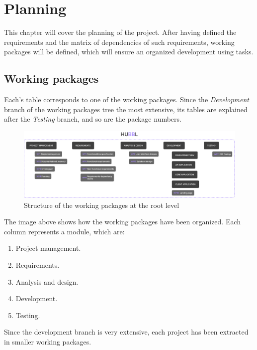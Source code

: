 \documentclass[a4paper, 12pt, oneside]{book}
\begin{document}
\chapter{Planning}
This chapter will cover the planning of the project. After having defined the requirements and the matrix of dependencies of such requirements, working packages will be defined, which will ensure an organized development using tasks.
\section{Working packages}
\label{working-packages}
Each's table corresponds to one of the working packages. Since the \emph{Development} branch of the working packages tree the most extensive, its tables are explained after the \emph{Testing} branch, and so are the package numbers.
\begin{figure}[H]
	\centering
	\includegraphics[width=\textwidth]{assets/working-packages/All.png}
	\caption{Structure of the working packages at the root level}
\end{figure}
The image above shows how the working packages have been organized. Each column represents a module, which are:
\begin{enumerate}[label = -]
	\item Project management.
	\item Requirements.
	\item Analysis and design.
	\item Development.
	\item Testing.
\end{enumerate}
Since the development branch is very extensive, each project has been extracted in smaller working packages.
\end{document}
